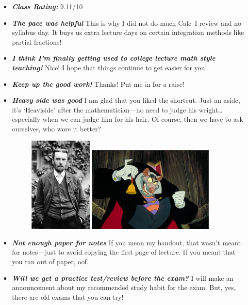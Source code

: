 \documentclass[11pt,letterpaper]{article}
\begin{document}
\begin{itemize}
\item {\bfseries\itshape Class Rating:} 9.11/10
\item {\bfseries\itshape The pace was helpful} This is why I did not do much Calc~I review and no syllabus day. It buys us extra lecture days on certain integration methods like partial fractions!

\item {\bfseries\itshape I think I'm finally getting used to college lecture math style teaching!} Nice! I hope that things continue to get easier for you! 

\item {\bfseries\itshape Keep up the good work!} Thanks! Put me in for a raise!

\item {\bfseries\itshape Heavy side was good} I am glad that you liked the shortcut. Just an aside, it's `Heaviside' after the mathematician---no need to judge his weight\dots especially when we can judge him for his hair. Of course, then we have to ask ourselves, who wore it better?
	\begin{figure}[H]
	\centering
	\includegraphics[width=0.3\textwidth]{images/heaviside.jpg}
	\includegraphics[width=0.6\textwidth]{images/ratigan.jpg}
	\end{figure}

\item {\bfseries\itshape Not enough paper for notes} If you mean my handout, that wasn't meant for notes---just to avoid copying the first page of lecture. If you meant that you ran out of paper, oof. 
 
\item {\bfseries\itshape Will we get a practice test/review before the exam?} I will make an announcement about my recommended study habit for the exam. But, yes, there are old exams that you can try!
\end{itemize}
\end{document}
